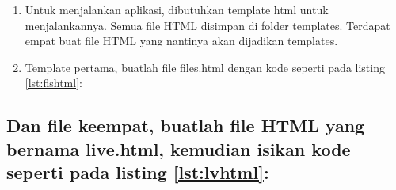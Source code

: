 \begin{enumerate}
\item Untuk menjalankan aplikasi, dibutuhkan template html untuk menjalankannya. Semua file HTML disimpan di folder templates. Terdapat empat buat file HTML yang nantinya akan dijadikan templates.
\item Template pertama, buatlah file files.html dengan kode seperti pada listing \ref{lst:flshtml}:

\end{enumerate}

\subsection{Dan file keempat, buatlah file HTML yang bernama live.html, kemudian isikan kode seperti pada listing \ref{lst:lvhtml}:}


